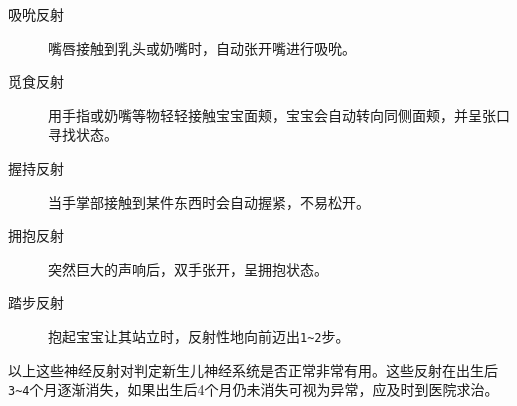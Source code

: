 
\begin{description}
\item[吸吮反射] 嘴唇接触到乳头或奶嘴时，自动张开嘴进行吸吮。
\item[觅食反射] 用手指或奶嘴等物轻轻接触宝宝面颊，宝宝会自动转向同侧面颊，并呈张口寻找状态。
\item[握持反射] 当手掌部接触到某件东西时会自动握紧，不易松开。
\item[拥抱反射] 突然巨大的声响后，双手张开，呈拥抱状态。
\item[踏步反射] 抱起宝宝让其站立时，反射性地向前迈出\texttt{1\textasciitilde{}2}\hspace{0pt}步。
\end{description}

以上这些神经反射对判定新生儿神经系统是否正常非常有用。这些反射在出生后\texttt{3\textasciitilde{}4}\hspace{0pt}个月逐渐消失，如果出生后4个月仍未消失可视为异常，应及时到医院求治。

